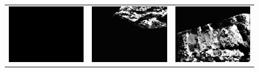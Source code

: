 \documentclass[11pt]{report}
\begin{document}
\begin{figure}[H]
\begin{tabular}{ccc}
    \includegraphics[scale=0.1]{images/disparity-opencv-t/disparity_8.png} &
    \includegraphics[scale=0.1]{images/disparity-opencv-d/disparity_8.png} &
    \includegraphics[scale=0.1]{images/disparity-opengv/disparity_8.png} \\

\end{tabular}
\end{figure}
\end{document}
